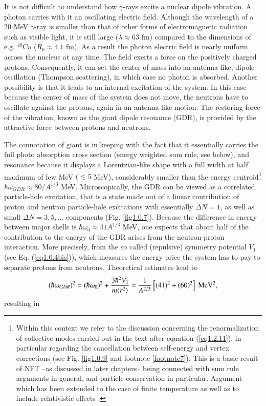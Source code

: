 It is not difficult to understand how $\gamma$-rays excite a nuclear dipole vibration. A photon carries with it an oscillating electric field. Although the wavelength of a 20 MeV $\gamma$-ray is smaller than that of other forms of electromagnetic radiation such as visible light, it is still large ($\lambda\approx63$ fm) compared to the dimensions of e.g. $^{40}$Ca ($R_0\approx4.1$ fm). As a result the photon electric field is nearly uniform across the nucleus at any time. The field exerts a force on the positively charged protons. Consequently, it can set the center of mass into an antenna like, dipole oscillation (Thompson scattering), in which case no photon is absorbed. Another possibility is that it leads to an internal excitation of the system. In this case because the center of mass of the system does not move, the neutrons have to oscillate against the protons, again in an antenna-like motion. The restoring force of the vibration, known as the giant dipole resonance (GDR), is provided by the attractive force between protons and neutrons.

The connotation of giant is in keeping with the fact that it essentially carries the full photo absorption cross section (energy weighted sum rule, see below), and resonance because it displays a Lorentzian-like shape with a full width at half maximum of few MeV $(\lesssim5$ MeV), considerably  smaller than the energy centroid\footnote{Within this context we refer to the discussion concerning the renormalization of collective modes carried out in the text after equation (\ref{eq1.2.11}), in particular regarding the cancellation between self-energy and vertex corrections (see Fig. \ref{fig1.0.9} and footnote \ref{footnote7}). This is a basic result of NFT --as discussed in later chapters-- being connected with sum rule arguments in general, and particle conservation in particular. Argument which has been extended to the case of finite temperature as well as to include relativistic effects \cite{Ward:50,Nambu:60,Bortignon:81,Bertsch:83,Bortignon:98,Litvinova:18,Wibowo:19}.} $\hbar\omega_{GDR}\approx80/A^{1/3}$ MeV. Microscopically, the GDR can be viewed as a correlated particle-hole excitation, that is a state made out of a linear contribution of proton and neutron particle-hole excitations with essentially $\Delta N=1$, as well as small $\Delta N=3,5,\dots$ components (Fig. \ref{fig1.0.7}). Because the difference in energy between major shells is $\hbar\omega_0\approx41A^{1/3}$ MeV, one expects that about half of the contribution to the energy of the GDR arises from the neutron-proton interaction. More precisely, from the so called (repulsive) symmetry potential $V_1$ (see Eq.  (\ref{eq1.0.4bis})), which measures the energy price the system has to pay to separate protons from neutrons. Theoretical estimates lead to 
\begin{align}\label{eq0.1.106}
(\hbar\omega_{GDR})^2=(\hbar\omega_0)^2+\frac{3\hbar^2V_1}{m\langle {r^2} \rangle}=\frac{1}{A^{2/3}}\left[(41)^2+(60)^2\right]\text{ MeV}^2,
\end{align}
resulting in

